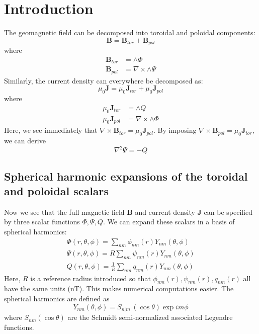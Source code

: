 \documentclass{article}
\newcommand{\B}{\mathbf{B}}
\newcommand{\J}{\mathbf{J}}
\begin{document}
\section{Introduction}

The geomagnetic field can be decomposed into toroidal and poloidal
components:
\begin{equation}
\B = \B_{tor} + \B_{pol}
\label{eqn:Btot}
\end{equation}
where
\begin{align}
\B_{tor} &= \wedge \Phi \\
\B_{pol} &= \nabla \times \wedge \Psi
\end{align}
Similarly, the current density can everywhere be decomposed as:
\begin{equation}
\mu_0 \J = \mu_0 \J_{tor} + \mu_0 \J_{pol}
\end{equation}
where
\begin{align}
\mu_0 \J_{tor} &= \wedge Q \\
\mu_0 \J_{pol} &= \nabla \times \wedge \Phi
\end{align}
Here, we see immediately that $\nabla \times \B_{tor} = \mu_0 \J_{pol}$.
By imposing $\nabla \times \B_{pol} = \mu_0 \J_{tor}$, we can derive
\begin{equation}
\nabla^2 \Psi = -Q
\end{equation}

\subsection{Spherical harmonic expansions of the toroidal and poloidal scalars}

Now we see that the full magnetic field $\B$ and current density $\J$
can be specified by three scalar functions $\Phi,\Psi,Q$. We can
expand these scalars in a basis of spherical harmonics:
\begin{align}
\Phi(r,\theta,\phi) = \sum_{nm} \phi_{nm}(r) Y_{nm}(\theta,\phi) \\
\Psi(r,\theta,\phi) = R \sum_{nm} \psi_{nm}(r) Y_{nm}(\theta,\phi) \\
Q(r,\theta,\phi) = \frac{1}{R} \sum_{nm} q_{nm}(r) Y_{nm}(\theta,\phi) \label{eqn:Q}
\end{align}
Here, $R$ is a reference radius introduced so that
$\phi_{nm}(r),\psi_{nm}(r),q_{nm}(r)$ all have the same units (nT).
This makes numerical computations easier. The spherical harmonics
are defined as
\begin{equation}
Y_{nm}(\theta,\phi) = S_{n|m|}(\cos{\theta}) \exp{im\phi}
\end{equation}
where $S_{nm}(\cos{\theta})$ are the Schmidt semi-normalized associated
Legendre functions.
\end{document}
